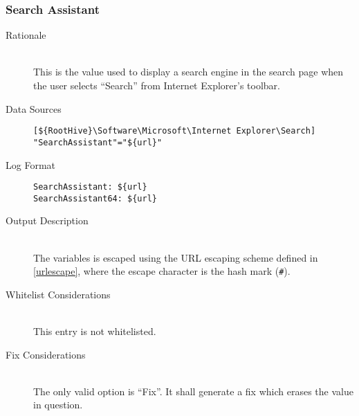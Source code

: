 \subsubsection{Search Assistant}
\begin{description}
\item[Rationale] \hfill \\
This is the value used to display a search engine in the search page when the
user selects ``Search'' from Internet Explorer's toolbar.

\item[Data Sources] \hfill
\vspace{-\baselineskip}
\begin{verbatim}
[${RootHive}\Software\Microsoft\Internet Explorer\Search]
"SearchAssistant"="${url}"
\end{verbatim}
\item[Log Format] \hfill
\vspace{-\baselineskip}
\begin{verbatim}
SearchAssistant: ${url}
SearchAssistant64: ${url}
\end{verbatim}
\item[Output Description] \hfill \\
The variables  is escaped using the URL escaping
scheme defined in \ref{urlescape}, where the escape character is the hash mark
(\verb|#|).
\item[Whitelist Considerations] \hfill \\
This entry is not whitelisted.
\item[Fix Considerations] \hfill \\
The only valid option is ``Fix''. It shall generate a fix which erases the value
in question.
\end{description}

